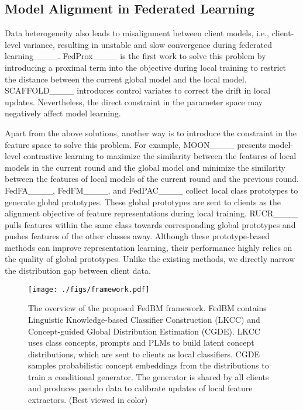 \subsection{Model Alignment in Federated Learning}
Data heterogeneity also leads to misalignment between client models, i.e., client-level variance,  resulting in unstable and slow convergence during federated learning____. 
FedProx____ is the first work to solve this problem by introducing a proximal term into the objective during local training to restrict the distance between the current global model and the local model.  SCAFFOLD____ introduces control variates to correct the drift in local updates. Nevertheless, the direct constraint in the parameter space may negatively affect model learning. 

Apart from the above solutions, another way is to introduce the constraint in the feature space to solve this problem. For example,
MOON____ presents model-level contrastive learning to maximize the similarity between the features of local models in the current round and the global model and minimize the similarity between the features of local models of the current round and the previous round.  
FedFA____, FedFM____, and FedPAC____ collect local class prototypes to generate global prototypes. These global prototypes are sent to clients as the alignment objective of feature representations during local training. 
RUCR____ pulls features within the same class towards corresponding global prototypes and
pushes features of the other classes away.
Although these prototype-based methods can improve representation learning, their performance highly relies on the quality of global prototypes. Unlike the existing methods, we directly narrow the distribution gap between client data.
\begin{figure*}[!t]
\centering
\texttt{[image: ./figs/framework.pdf]}
\caption{The overview of the proposed FedBM framework. FedBM contains Linguistic Knowledge-based Classifier Construction (LKCC) and Concept-guided Global Distribution Estimation (CGDE). LKCC uses class concepts, prompts and PLMs to build latent concept distributions, which are sent to clients as local classifiers. CGDE samples probabilistic concept embeddings from the distributions to train a conditional generator. The generator is shared by all clients and produces pseudo data to calibrate updates of local feature extractors. (Best viewed in color) }
\label{framework}
\end{figure*}

